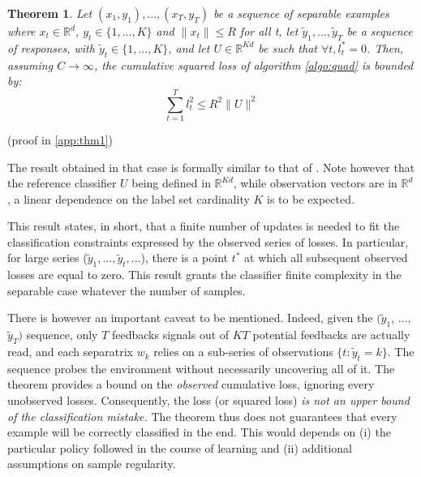 \documentclass[preprint,12pt,authoryear]{elsarticle}
\newtheorem{theorem}{Theorem}
\begin{document}

\begin{theorem}
	\label{theo:BPAT1}
	Let $(x_1,y_1),...,(x_T,y_T)$ be a sequence of separable examples where $x_t \in \mathbb{R}^d$, $y_t\in \{1,...,K\}$ and $\parallel x_t\parallel\leqslant R$ for all t, let $\tilde{y}_1,...,\tilde{y}_T$ be a sequence of responses, with $\tilde{y}_t\in \{1,...,K\}$, 
	and let $U \in \mathbb{R}^{K d}$ be such that $ \forall t, l^*_t=0$. Then, assuming $C \rightarrow \infty$, the cumulative squared loss of algorithm \ref{algo:quad} is bounded by:
	\begin{equation}
	\sum_{t=1}^{T} l_t^2 \leqslant R^2 \parallel{U}\parallel^2
	\end{equation}
\end{theorem}
(proof in \ref{app:thm1})

The result obtained in that case is formally similar to that of  \cite{crammer2006online}. Note however that the reference classifier $U$ being defined in $\mathbb{R}^{Kd}$, while observation vectors are in $\mathbb{R}^{d}$, a linear dependence on the label set cardinality $K$ is to be expected. 

This result states, in short, that a finite number of updates is needed to fit the classification constraints expressed by the observed series of losses. In particular, for large series ($\tilde{y}_1, ...,\tilde{y}_t, ...$), there is a point $t^*$ at which all subsequent observed losses are equal to zero. This result grants the classifier finite complexity in the separable case whatever the number of samples. 

There is however an important caveat to be mentioned. 
Indeed, given the  $ (\tilde{y}_1$, ..., $\tilde{y}_T)$ sequence, only $T$ feedbacks signals out of $KT$ potential feedbacks are actually read,
and each separatrix $w_k$ relies on a sub-series of observations $\{t: \tilde{y}_t = k\}$.
The sequence probes the environment without necessarily uncovering all of it. The theorem provides a bound on the \emph{observed} cumulative loss, ignoring every unobserved losses. 
Consequently, the loss (or squared loss) \emph{is not an upper bound of the classification mistake.} The theorem thus does not guarantees that every example will be correctly classified in the end. This would depends on (i) the particular policy followed in the course of learning and (ii)  additional assumptions on sample regularity.   
\end{document}
